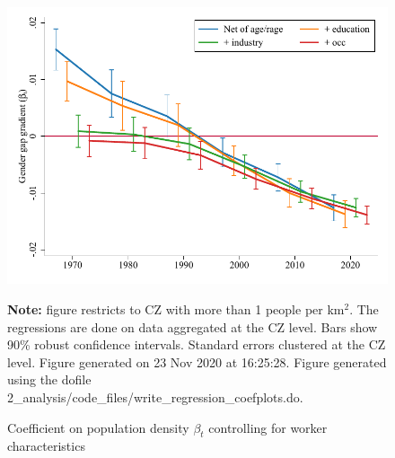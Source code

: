 \begin{figure}[!h]
\centering
\caption{Coefficient on population density $ \beta_t $ controlling for worker characteristics}
\label{fig:controls}
\includegraphics[width=1\textwidth]{../2_analysis/output/figures/with_control_gradients_individual_l_czone_density_full_time}
\par \begin{minipage}[h]{\textwidth}{\tiny\textbf{Note:} figure restricts to CZ with more than 1 people per km$^2$. The regressions are done on data aggregated at the CZ level. Bars show 90\% robust confidence intervals. Standard errors clustered at the CZ level. Figure generated on 23 Nov 2020 at 16:25:28. Figure generated using the dofile 2\_analysis/code\_files/write\_regression\_coefplots.do.}\end{minipage}
\end{figure}
